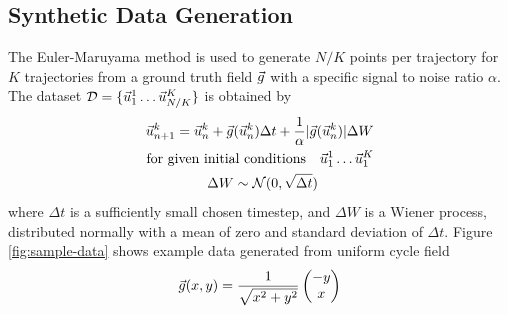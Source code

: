 \subsection{Synthetic Data Generation}
The Euler-Maruyama method is used to generate $N/K$ points per
trajectory for $K$ trajectories  from a ground truth field $\vec{g}$ with a
specific signal to noise ratio $\alpha$. The dataset 
$\mathcal{D}=\{\vec{u}_1^1\dots\vec{u}_{N/K}^K\}$ is obtained by
\vspace{-1em}
\begin{align}
    \vec{u}_{n+1}^k =
    \vec{u}_{n}^k +\vec{g}(\vec{u}_{n}^k)\Delta t
    +\frac{1}{\alpha}|\vec{g}(\vec{u}_{n}^k )|\Delta W\\
    \text{for given initial conditions}\quad\vec{u}_{1}^1 \dots \vec{u}_{1}^K\nonumber\\
    \Delta W \sim \mathcal{N}(0,\sqrt{\Delta t})\qquad\qquad
\end{align}
where $\Delta t$ is a sufficiently small chosen timestep, and $\Delta W$ is a Wiener
process, distributed normally with a mean of zero and standard deviation of $\Delta t$.
Figure \ref{fig:sample-data} shows example data generated from uniform cycle field
\begin{equation}
    \vec{g}(x,y)=\frac{1}{\sqrt{x^2+y^2}}
    \begin{pmatrix}
    -y \\ x
    \end{pmatrix}
    \label{eq:cycle-field}
\end{equation}
\vspace{-2em}
